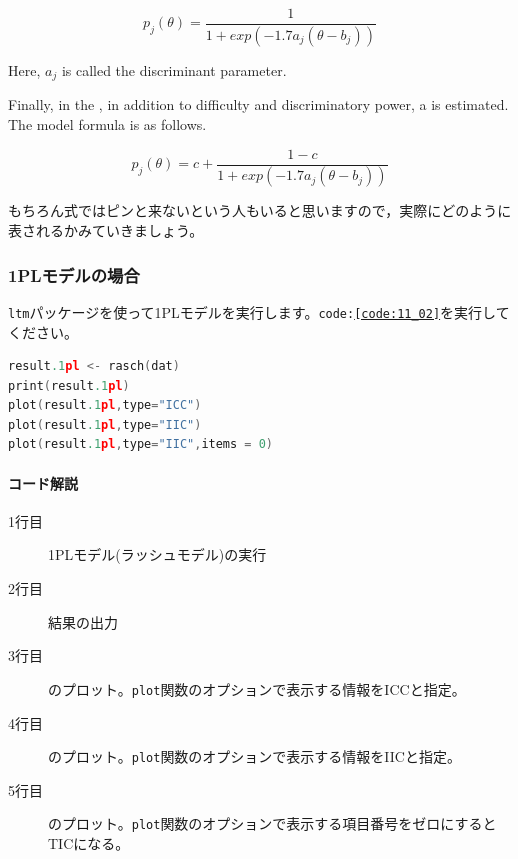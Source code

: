 \documentclass{ltjsbook}
\begin{document}
\[ p_j(\theta) = \frac{1}{1+exp(-1.7 a_j(\theta -b_j))} \]

Here, $a_j$ is called the discriminant parameter.

Finally, in the , in addition to difficulty and discriminatory power, a  is estimated. The model formula is as follows.

\[ p_j(\theta) =c+ \frac{1-c}{1+exp(-1.7 a_j(\theta -b_j))} \]

もちろん式ではピンと来ないという人もいると思いますので，実際にどのように表されるかみていきましょう。
\subsubsection{1PLモデルの場合}

\texttt{ltm}パッケージを使って1PLモデルを実行します。\texttt{code:\ref{code:11_02}}を実行してください。

\begin{lstlisting}[language=c++,label={code:11_02},caption={1PLモデルの実行}]
result.1pl <- rasch(dat)
print(result.1pl)
plot(result.1pl,type="ICC")
plot(result.1pl,type="IIC")
plot(result.1pl,type="IIC",items = 0)
\end{lstlisting}

\paragraph{コード解説}
\begin{description}
	\item[1行目] 1PLモデル(ラッシュモデル)の実行
	\item[2行目] 結果の出力
	\item[3行目] のプロット。\texttt{plot}関数のオプションで表示する情報をICCと指定。
	\item[4行目] のプロット。\texttt{plot}関数のオプションで表示する情報をIICと指定。
	\item[5行目] のプロット。\texttt{plot}関数のオプションで表示する項目番号をゼロにするとTICになる。
\end{description}
\end{document}
